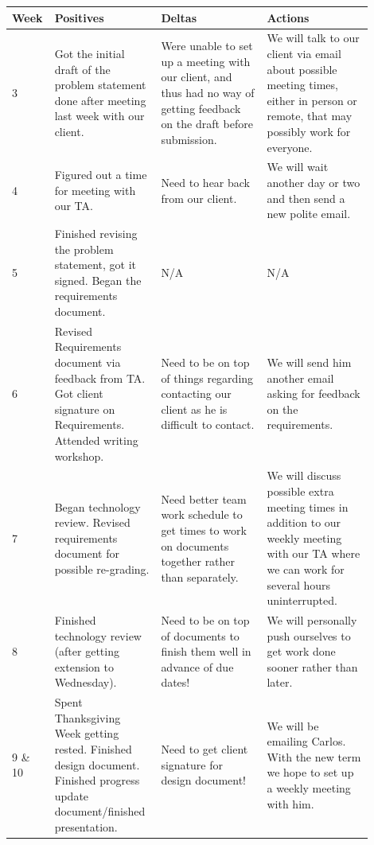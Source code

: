 \documentclass[onecolumn, draftclsnofoot,10pt, compsoc]{IEEEtran}
\begin{document}
\begin{tabular}{|p{0.05\linewidth}|p{0.285\linewidth}|p{0.285\linewidth}|p{0.285\linewidth}|}
\hline 
Week & Positives & Deltas & Actions \\ \hline

3 &
Got the initial draft of the problem statement done after meeting last 
	week with our client. &
Were unable to set up a meeting with our client, and thus had no way of 
	getting feedback on the draft before submission. &
We will talk to our client via email about possible meeting times, either 
	in person or remote, that may possibly work for everyone. \\ \hline

4 &
Figured out a time for meeting with our TA. &
Need to hear back from our client. &
We will wait another day or two and then send a new polite email. \\ \hline

5 &
Finished revising the problem statement, got it signed. Began the requirements document. & N/A & N/A\\ \hline

6 &
Revised Requirements document via feedback from TA. Got client signature on Requirements. 
	Attended writing workshop. &
Need to be on top of things regarding contacting our client as he is difficult to contact. &
We will send him another email asking for feedback on the requirements. \\ \hline

7 &
Began technology review. Revised requirements document for possible re-grading. &
Need better team work schedule to get times to work on documents together rather than separately. &
We will discuss possible extra meeting times in addition to our weekly meeting 
	with our TA where we can work for several hours uninterrupted. \\ \hline

8 &
Finished technology review (after getting extension to Wednesday). &
Need to be on top of documents to finish them well in advance of due dates! &
We will personally push ourselves to get work done sooner rather than later. \\ \hline


9 \& 10 &
Spent Thanksgiving Week getting rested. Finished design document. 
	Finished progress update document/finished presentation. &
Need to get client signature for design document! &
We will be emailing Carlos. With the new term we hope to set up a weekly meeting with him.  \\ \hline

\hline
\end{tabular}
\end{document}
